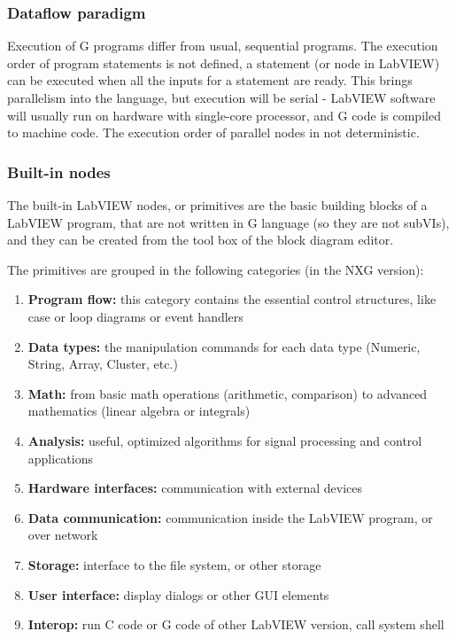 \subsubsection{Dataflow paradigm}
Execution of G programs differ from usual, sequential programs. The execution order of program statements is not defined, a statement (or node in LabVIEW) can be executed when all the inputs for a statement are ready. This brings parallelism into the language, but execution will be serial - LabVIEW software will usually run on hardware with single-core processor, and G code is compiled to machine code. \cite{labview_under_the_hood} The execution order of parallel nodes in not deterministic. 
\subsubsection{Built-in nodes}
The built-in LabVIEW nodes, or primitives are the basic building blocks of a LabVIEW program, that are not written in G language (so they are not subVIs), and they can be created from the tool box of the block diagram editor.

The primitives are grouped in the following categories (in the NXG version):
\begin{enumerate}
   \item \textbf{Program flow:} this category contains the essential control structures, like case or loop diagrams or event handlers
   \item \textbf{Data types:} the manipulation commands for each data type (Numeric, String, Array, Cluster, etc.)
   \item \textbf{Math:} from basic math operations (arithmetic, comparison) to advanced mathematics (linear algebra or integrals)
      \item \textbf{Analysis:} useful, optimized algorithms for signal processing and control applications
      \item \textbf{Hardware interfaces:} communication with external devices
            \item \textbf{Data communication:} communication inside the LabVIEW program, or over network
                  \item \textbf{Storage:} interface to the file system, or other storage
                        \item \textbf{User interface:} display dialogs or other GUI elements
         \item \textbf{Interop:} run C code or G code of other LabVIEW version, call system shell
\end{enumerate}
